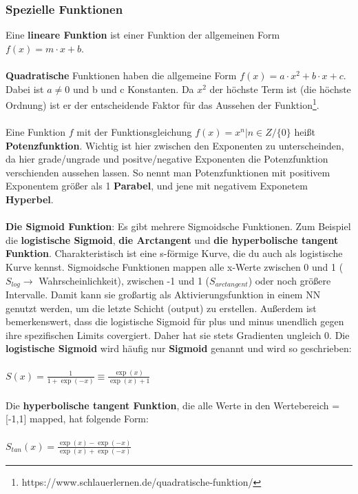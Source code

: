 \documentclass[letterpaper, titlepage]{article}
\begin{document}
\subsubsection{Spezielle Funktionen}\label{Die wichtigsten Funktionen}
Eine \textbf{lineare Funktion} ist einer Funktion der allgemeinen Form $f(x)=m\cdot x +b$.
\\ \\
\textbf{Quadratische} Funktionen haben die allgemeine Form $f(x)=a\cdot x^2+b\cdot x+c$. Dabei ist $a \neq 0$ und b und c Konstanten. Da $x^2$ der höchste Term ist (die höchste Ordnung) ist er der entscheidende Faktor für das Aussehen der Funktion\footnote{https://www.schlauerlernen.de/quadratische-funktion/}.
\\ \\
Eine Funktion $f$ mit der Funktionsgleichung $f(x)=x^n | n \in Z/\{0\}$ heißt \textbf{Potenzfunktion}. Wichtig ist hier zwischen den Exponenten zu unterscheinden, da hier grade/ungrade und positve/negative Exponenten die Potenzfunktion verschienden aussehen lassen. So nennt man Potenzfunktionen mit positivem Exponentem größer als 1 \textbf{Parabel}, und jene mit negativem Exponetem \textbf{Hyperbel}.
\\ \\
\textbf{Die Sigmoid Funktion}: Es gibt mehrere Sigmoidsche Funktionen. Zum Beispiel die \textbf{logistische Sigmoid}, \textbf{die Arctangent} und \textbf{die hyperbolische tangent Funktion}. Charakteristisch ist eine s-förmige Kurve, die du auch als logistische Kurve kennst. Sigmoidsche Funktionen mappen alle x-Werte zwischen 0 und 1 ($S_{log} \rightarrow$ Wahrscheinlichkeit), zwischen -1 und 1 ($S_{arctangent}$) oder noch größere Intervalle. Damit kann sie großartig als Aktivierungsfunktion in einem NN genutzt werden, um die letzte Schicht (output) zu erstellen. Außerdem ist bemerkenswert, dass die logistische Sigmoid für plus und minus unendlich gegen ihre spezifischen Limits covergiert. Daher hat sie stets Gradienten ungleich 0. Die \textbf{logistische Sigmoid} wird häufig nur \textbf{Sigmoid} genannt und wird so geschrieben:
\\ \\
$S(x)=\frac{1}{1+\exp(-x)} \equiv \frac{\exp(x)}{\exp(x)+1}$
\\ \\
Die \textbf{hyperbolische tangent Funktion}, die alle Werte in den Wertebereich = [-1,1] mapped, hat folgende Form:
\\ \\ $S_{tan}(x)=\frac{\exp(x)-\exp(-x)}{\exp(x)+\exp(-x)}$ 
\end{document}
